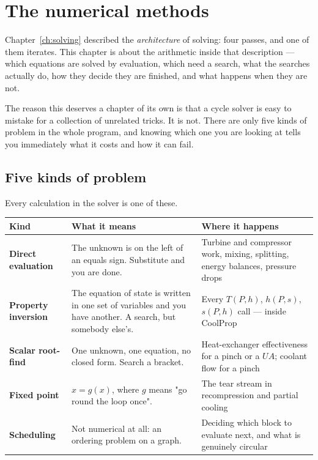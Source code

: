 \documentclass[11pt,a4paper]{report}
\begin{document}
\chapter{The numerical methods}
\label{ch:numerics}

Chapter~\ref{ch:solving} described the \emph{architecture} of solving: four
passes, and one of them iterates. This chapter is about the arithmetic
inside that description --- which equations are solved by evaluation, which
need a search, what the searches actually do, how they decide they are
finished, and what happens when they are not.

The reason this deserves a chapter of its own is that a cycle solver is
easy to mistake for a collection of unrelated tricks. It is not. There are
only five kinds of problem in the whole program, and knowing which one you
are looking at tells you immediately what it costs and how it can fail.

\section{Five kinds of problem}
\label{sec:problemtypes}

Every calculation in the solver is one of these.

\begin{center}
\small
\begin{tabular}{@{}p{3.1cm}p{5.3cm}p{5.0cm}@{}}
\toprule
Kind & What it means & Where it happens \\
\midrule
\textbf{Direct evaluation} &
The unknown is on the left of an equals sign. Substitute and you are done. &
Turbine and compressor work, mixing, splitting, energy balances, pressure
drops \\[2pt]
\textbf{Property inversion} &
The equation of state is written in one set of variables and you have
another. A search, but somebody else's. &
Every $T(P,h)$, $h(P,s)$, $s(P,h)$ call --- inside CoolProp \\[2pt]
\textbf{Scalar root-find} &
One unknown, one equation, no closed form. Search a bracket. &
Heat-exchanger effectiveness for a pinch or a $UA$; coolant flow for a
pinch \\[2pt]
\textbf{Fixed point} &
$x = g(x)$, where $g$ means "go round the loop once". &
The tear stream in recompression and partial cooling \\[2pt]
\textbf{Scheduling} &
Not numerical at all: an ordering problem on a graph. &
Deciding which block to evaluate next, and what is genuinely circular \\
\bottomrule
\end{tabular}
\end{center}
\end{document}
